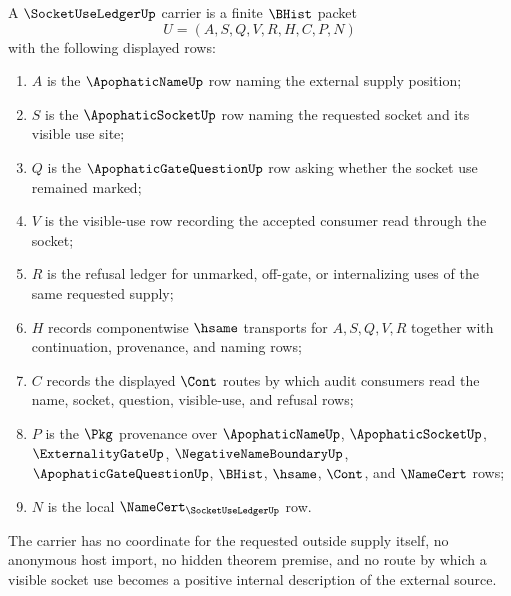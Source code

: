 \begin{definition}
\label{def:socket-use-ledger-carrier}
A $\SocketUseLedgerUp$ carrier is a finite $\BHist$ packet
$$
U=(A,S,Q,V,R,H,C,P,N)
$$
with the following displayed rows:
\begin{enumerate}
\item $A$ is the $\ApophaticNameUp$ row naming the external supply position;
\item $S$ is the $\ApophaticSocketUp$ row naming the requested socket and its visible use site;
\item $Q$ is the $\ApophaticGateQuestionUp$ row asking whether the socket use remained marked;
\item $V$ is the visible-use row recording the accepted consumer read through the socket;
\item $R$ is the refusal ledger for unmarked, off-gate, or internalizing uses of the same requested supply;
\item $H$ records componentwise $\hsame$ transports for $A,S,Q,V,R$ together with continuation, provenance, and naming rows;
\item $C$ records the displayed $\Cont$ routes by which audit consumers read the name, socket, question, visible-use, and refusal rows;
\item $P$ is the $\Pkg$ provenance over $\ApophaticNameUp$, $\ApophaticSocketUp$, $\ExternalityGateUp$, $\NegativeNameBoundaryUp$, $\ApophaticGateQuestionUp$, $\BHist$, $\hsame$, $\Cont$, and $\NameCert$ rows;
\item $N$ is the local $\NameCert_{\SocketUseLedgerUp}$ row.
\end{enumerate}
The carrier has no coordinate for the requested outside supply itself, no anonymous host import, no hidden theorem premise, and no route by which a visible socket use becomes a positive internal description of the external source.
\end{definition}

